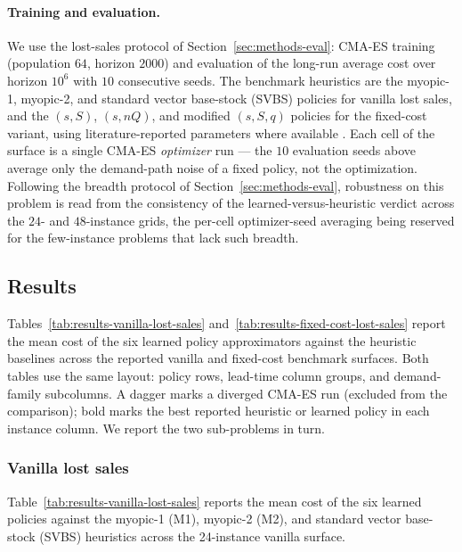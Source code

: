 \documentclass[11pt]{article}
\begin{document}
\paragraph{Training and evaluation.}
We use the lost-sales protocol of Section~\ref{sec:methods-eval}: CMA-ES training (population $64$,
horizon $2000$) and evaluation of the long-run average cost over horizon $10^6$ with $10$ consecutive
seeds. The benchmark heuristics are the myopic-1, myopic-2, and standard vector base-stock (SVBS)
policies for vanilla lost sales, and the $(s,S)$, $(s,nQ)$, and modified $(s,S,q)$ policies for the
fixed-cost variant, using literature-reported parameters where available
\citep{Zipkin2008OldSystems,Bijvank2015ParametricPolicies}.
Each cell of the surface is a single CMA-ES \emph{optimizer} run --- the $10$ evaluation seeds above
average only the demand-path noise of a fixed policy, not the optimization. Following the breadth
protocol of Section~\ref{sec:methods-eval}, robustness on this problem is read from the consistency of
the learned-versus-heuristic verdict across the $24$- and $48$-instance grids, the per-cell
optimizer-seed averaging being reserved for the few-instance problems that lack such breadth.

\subsection{Results}

Tables~\ref{tab:results-vanilla-lost-sales} and~\ref{tab:results-fixed-cost-lost-sales} report the
mean cost of the six learned policy approximators against the heuristic baselines across the reported
vanilla and fixed-cost benchmark surfaces. Both tables use the same layout: policy rows, lead-time
column groups, and demand-family subcolumns. A dagger marks a diverged CMA-ES run (excluded from the
comparison); bold marks the best reported heuristic or learned policy in each instance column. We
report the two sub-problems in turn.

\subsubsection{Vanilla lost sales}
\label{sec:lostsales-results-vanilla}

Table~\ref{tab:results-vanilla-lost-sales} reports the mean cost of the six learned policies against
the myopic-1 (M1), myopic-2 (M2), and standard vector base-stock (SVBS) heuristics across the
24-instance vanilla surface.
\end{document}
